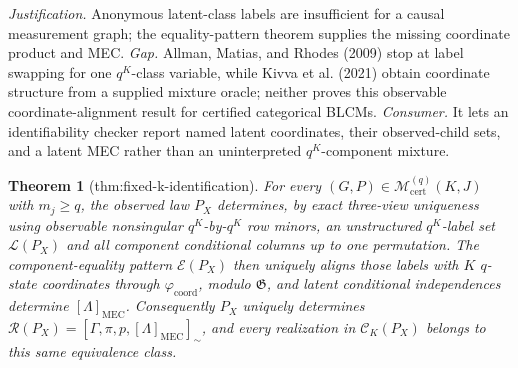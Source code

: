 \documentclass{article}
\newtheorem{theorem}{Theorem}
\begin{document}
\par\smallskip\noindent \textit{Justification.} Anonymous latent-class labels are insufficient for a causal measurement graph; the equality-pattern theorem supplies the missing coordinate product and MEC. \textit{Gap.} Allman, Matias, and Rhodes (2009) stop at label swapping for one \(q^K\)-class variable, while Kivva et al. (2021) obtain coordinate structure from a supplied mixture oracle; neither proves this observable coordinate-alignment result for certified categorical BLCMs. \textit{Consumer.} It lets an identifiability checker report named latent coordinates, their observed-child sets, and a latent MEC rather than an uninterpreted \(q^K\)-component mixture.

\begin{theorem}[thm:fixed-k-identification]\label{thm:fixed-k-identification}
For every \((G,P)\in\mathcal M_{\mathrm{cert}}^{(q)}(K,J)\) with \(m_j\ge q\), the observed law \(P_X\) determines, by exact three-view uniqueness using observable nonsingular \(q^K\)-by-\(q^K\) row minors, an unstructured \(q^K\)-label set \(\mathscr L(P_X)\) and all component conditional columns up to one permutation.  The component-equality pattern \(\mathcal E(P_X)\) then uniquely aligns those labels with \(K\) \(q\)-state coordinates through \(\varphi_{\mathrm{coord}}\), modulo \(\mathfrak G\), and latent conditional independences determine \([\Lambda]_{\mathrm{MEC}}\).  Consequently \(P_X\) uniquely determines \(\mathcal R(P_X)=[\Gamma,\pi,p,[\Lambda]_{\mathrm{MEC}}]_{\sim}\), and every realization in \(\mathcal C_K(P_X)\) belongs to this same equivalence class.
\end{theorem}
\end{document}

